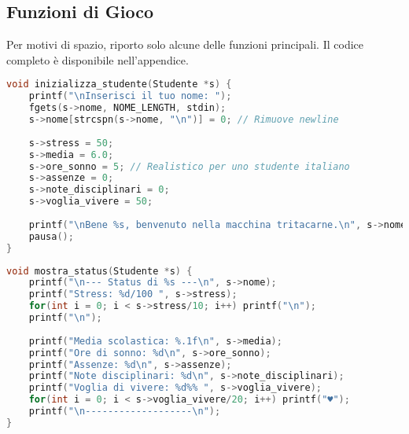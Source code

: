\documentclass[a4paper,12pt]{article}
\begin{document}
\subsection{Funzioni di Gioco}

Per motivi di spazio, riporto solo alcune delle funzioni principali. Il codice completo è disponibile nell'appendice.

\begin{lstlisting}[language=C, caption=Funzione di inizializzazione]
void inizializza_studente(Studente *s) {
    printf("\nInserisci il tuo nome: ");
    fgets(s->nome, NOME_LENGTH, stdin);
    s->nome[strcspn(s->nome, "\n")] = 0; // Rimuove newline
    
    s->stress = 50;
    s->media = 6.0;
    s->ore_sonno = 5; // Realistico per uno studente italiano
    s->assenze = 0;
    s->note_disciplinari = 0;
    s->voglia_vivere = 50;
    
    printf("\nBene %s, benvenuto nella macchina tritacarne.\n", s->nome);
    pausa();
}
\end{lstlisting}

\begin{lstlisting}[language=C, caption=Funzione di visualizzazione stato]
void mostra_status(Studente *s) {
    printf("\n--- Status di %s ---\n", s->nome);
    printf("Stress: %d/100 ", s->stress);
    for(int i = 0; i < s->stress/10; i++) printf("\n");
    printf("\n");
    
    printf("Media scolastica: %.1f\n", s->media);
    printf("Ore di sonno: %d\n", s->ore_sonno);
    printf("Assenze: %d\n", s->assenze);
    printf("Note disciplinari: %d\n", s->note_disciplinari);
    printf("Voglia di vivere: %d%% ", s->voglia_vivere);
    for(int i = 0; i < s->voglia_vivere/20; i++) printf("♥");
    printf("\n-------------------\n");
}
\end{lstlisting}
\end{document}
